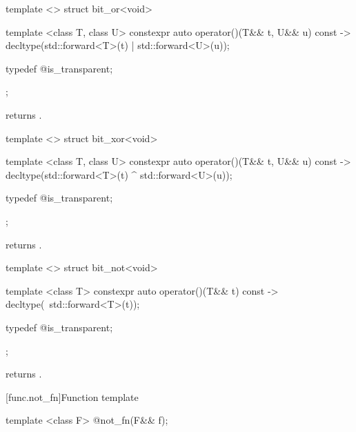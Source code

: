 %
\begin{itemdecl}
template <> struct bit_or<void> {
  template <class T, class U> constexpr auto operator()(T&& t, U&& u) const
    -> decltype(std::forward<T>(t) | std::forward<U>(u));

  typedef @\unspec@ is_transparent;
};
\end{itemdecl}

\begin{itemdescr}
\pnum
{} returns .
\end{itemdescr}

%
\begin{itemdecl}
template <> struct bit_xor<void> {
  template <class T, class U> constexpr auto operator()(T&& t, U&& u) const
    -> decltype(std::forward<T>(t) ^ std::forward<U>(u));

  typedef @\unspec@ is_transparent;
};
\end{itemdecl}

\begin{itemdescr}
\pnum
{} returns .
\end{itemdescr}

%
\begin{itemdecl}
template <> struct bit_not<void> {
  template <class T> constexpr auto operator()(T&& t) const
    -> decltype(~std::forward<T>(t));

  typedef @\unspec@ is_transparent;
};
\end{itemdecl}

\begin{itemdescr}
\pnum
{} returns .
\end{itemdescr}

[func.not_fn]{Function template }

%
\begin{itemdecl}
template <class F> @\unspec@ not_fn(F&& f);
\end{itemdecl}

